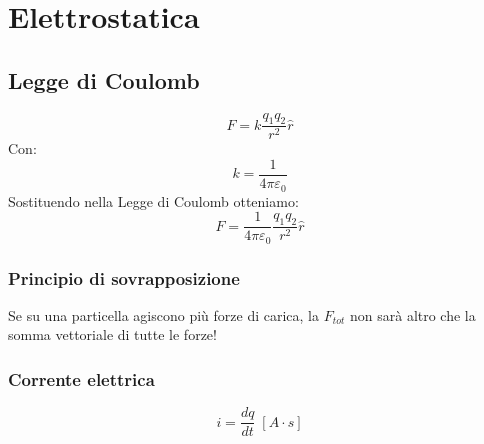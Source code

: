 \chapter{Elettrostatica}

    \section{Legge di Coulomb}
        \begin{equation}
            F = k\frac{q_1q_2}{r^2}\widehat{r}
        \end{equation}
    Con:
    \begin{equation}
        k = \frac{1}{4\pi\varepsilon_0}
    \end{equation}
    Sostituendo nella Legge di Coulomb otteniamo:
    \begin{equation}
        F = \frac{1}{4\pi\varepsilon_0}\frac{q_1q_2}{r^2}\widehat{r}
    \end{equation}
        \subsection{Principio di sovrapposizione}
        Se su una particella agiscono più forze di carica, la $F_{tot}$ non 
        sarà altro che la somma vettoriale di tutte le forze!

        \subsection{Corrente elettrica}
            \begin{equation}
                i = \frac{dq}{dt} \; [A \cdot s]
            \end{equation}
    
